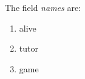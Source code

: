 The field \emph{names} are:
\begin{enumerate}
	\item alive
	\item tutor
	\item game
\end{enumerate}
